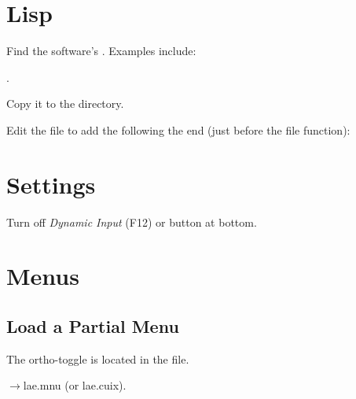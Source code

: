 \documentclass{lebook}
\newcommand*{\supportdir}{\textcode{\textit{support}}}
\begin{document}
\section{Lisp}
\begin{numberedlist}
    \item Find the software's .  Examples include:
    \begin{bulletedlist}
    	\item {}
    	\item {}.
    \end{bulletedlist}
    \item Copy it to the \supportdir{} directory.
    \item Edit the file to add the following the end (just before the file  function):
    \begin{plainlist}
    	\item {}
		\item {}
    \end{plainlist}

\end{numberedlist}


\section{Settings}
\begin{bulletedlist}
	\item Turn off \textit{Dynamic Input} (F12) or button at bottom.
\end{bulletedlist}


\section{Menus}
\subsection{Load a Partial Menu}
The  ortho-toggle is located in the  file.
\begin{bulletedlist}
	\item {}$\rightarrow$lae.mnu (or lae.cuix). 
\end{bulletedlist}
\end{document}
